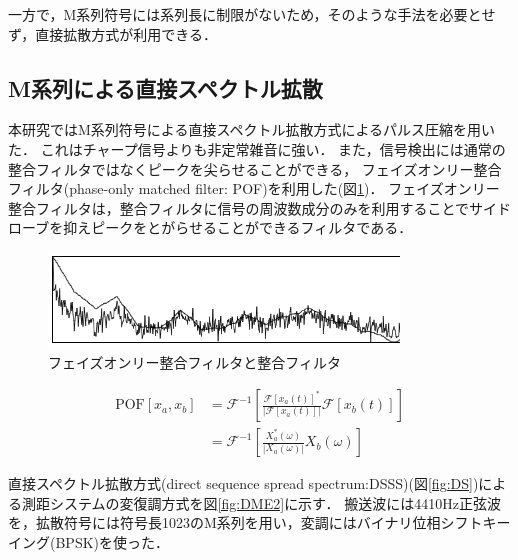 一方で，M系列符号には系列長に制限がないため，そのような手法を必要とせず，直接拡散方式が利用できる．





\subsection{M系列による直接スペクトル拡散}

本研究ではM系列符号による直接スペクトル拡散方式によるパルス圧縮を用いた．
これはチャープ信号よりも非定常雑音に強い\cite{nonlinear}．
また，信号検出には通常の整合フィルタではなくピークを尖らせることができる，
フェイズオンリー整合フィルタ(phase-only matched filter: POF)\cite{pof, phaseonly2}を利用した(図\ref{fig:pof})．
フェイズオンリー整合フィルタは，整合フィルタに信号の周波数成分のみを利用することでサイドローブを抑えピークをとがらせることができるフィルタである．

\begin{figure}[p]\centering
  \hspace{-2mm}\includegraphics[clip,width=1.1\hsize]{img/POF.png}
  \caption{フェイズオンリー整合フィルタと整合フィルタ}\label{fig:pof}
\end{figure}

$$
\begin{aligned}
\mathrm{POF}[x_a, x_b]
&= \mathcal{F}^{-1}\left[\frac{\mathcal{F}\left[x_a(t)\right]^*}{|\mathcal{F}\left[x_a(t)\right]|}\mathcal{F}\left[x_b(t)\right]\right] \\
&= \mathcal{F}^{-1}\left[\frac{X_a^*(\omega)}{|X_a(\omega)|}X_b(\omega)\right]
\end{aligned}
$$


直接スペクトル拡散方式(direct sequence spread spectrum:DSSS)(図\ref{fig:DS})による測距システムの変復調方式を図\ref{fig:DME2}に示す．
搬送波には4410Hz正弦波を，拡散符号には符号長1023のM系列を用い，変調にはバイナリ位相シフトキーイング(BPSK)を使った．

